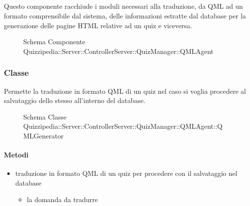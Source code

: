 \subsection{}
Questo componente racchiude i moduli necessari alla traduzione, da QML ad un formato comprensibile dal sistema, delle informazioni estratte dal database per la generazione delle pagine HTML relative ad un quiz e viceversa.
\begin{figure}[H]
\centering
\noindent{}
\caption[Schema Componente Quizzipedia::Server::ControllerServer::QuizManager::QMLAgent]{Schema Componente Quizzipedia::Server::ControllerServer::QuizManager::QMLAgent}
\end{figure}
\subsubsection{Classe }
Permette la traduzione in formato QML di un quiz nel caso si voglia procedere al salvataggio dello stesso all'interno del database.
\begin{figure}[H]
\centering
\noindent{}
\caption[Schema Classe QMLGenerator]{Schema Classe Quizzipedia::Server::ControllerServer::QuizManager::QMLAgent::QMLGenerator}
\end{figure}
\paragraph{Metodi}
\begin{itemize}
\item {}
\newline
traduzione in formato QML di un quiz per procedere con il salvataggio nel database
\newline
{}
\newline
\begin{itemize}
\item {}
\newline
la domanda da tradurre
\end{itemize}
\end{itemize}
